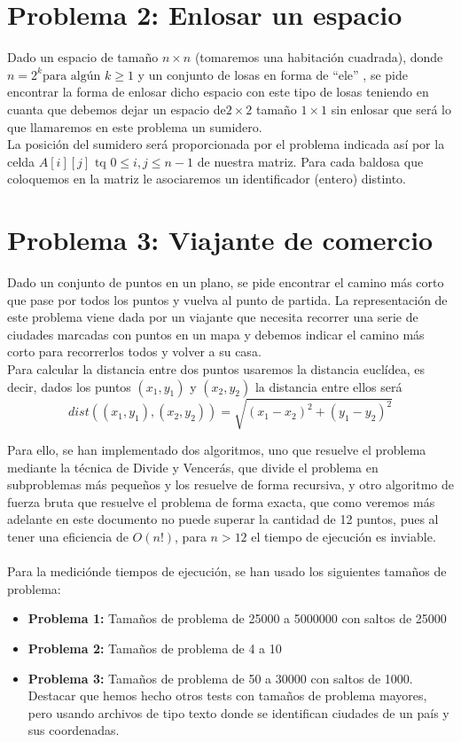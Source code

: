 \documentclass[11pt,openany]{book}
\begin{document}
\section{Problema 2: Enlosar un espacio}
Dado un espacio de tamaño $n \times n$ (tomaremos una habitación cuadrada), donde $n=2^k \text{para algún } k \geq 1$ y un conjunto de losas en forma de \enquote{ele} , se pide encontrar la forma de enlosar
dicho espacio con este tipo de losas teniendo en cuanta que debemos dejar un espacio de$2 \times 2$ tamaño $1 \times 1$ sin enlosar que será lo
que llamaremos en este problema un sumidero. \\
La posición del sumidero será proporcionada por el problema indicada así por la celda $A[i][j] \text{ tq } 0 \leq i,j \leq n-1$ de 
nuestra matriz. Para cada baldosa que coloquemos en la matriz le asociaremos un identificador (entero) distinto.
\section{Problema 3: Viajante de comercio}
Dado un conjunto de puntos en un plano, se pide encontrar el camino más corto que pase por todos los puntos y vuelva al punto de partida. 
La representación de este problema viene dada por un viajante que necesita recorrer una serie de ciudades marcadas con puntos en un mapa y debemos
indicar el camino más corto para recorrerlos todos y volver a su casa. \\
Para calcular la distancia entre dos puntos usaremos la distancia euclídea, es decir,
dados los puntos $(x_1,y_1)$ y $(x_2,y_2)$ la distancia entre ellos será
\begin{equation*}
      dist((x_1,y_1), (x_2, y_2))=\sqrt{(x_1-x_2)^2+(y_1-y_2)^2}
\end{equation*}

Para ello, se han implementado dos algoritmos, uno que resuelve el problema
mediante la técnica de Divide y Vencerás, que divide el problema en subproblemas más pequeños y los resuelve de forma recursiva, y otro 
algoritmo de fuerza bruta que resuelve el problema de forma exacta, que como veremos más adelante en este documento no puede superar la cantidad de 12 puntos, pues
al tener una eficiencia de $O(n!)$, para $n>12$ el tiempo de ejecución es inviable. \\ \\

Para la mediciónde tiempos de ejecución, se han usado los siguientes tamaños de problema:
\begin{itemize}
      \item \textbf{Problema 1:} Tamaños de problema de 25000 a 5000000 con saltos de 25000
      \item \textbf{Problema 2:} Tamaños de problema de 4 a 10
      \item \textbf{Problema 3:} Tamaños de problema de 50 a 30000 con saltos de 1000. Destacar que hemos hecho otros tests con tamaños de problema mayores,
            pero usando archivos de tipo texto donde se identifican ciudades de un país y sus coordenadas.
\end{itemize}
\end{document}
